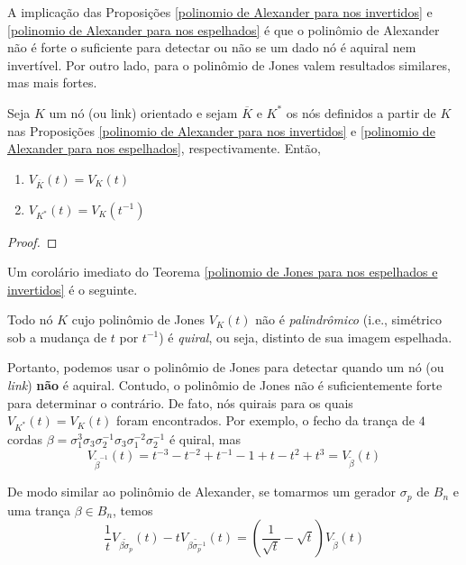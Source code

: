 	\par\vspace{0.3cm} A implicação das Proposições \eqref{polinomio de Alexander para nos invertidos} e \eqref{polinomio de Alexander para nos espelhados} é que o polinômio de Alexander não é forte o suficiente para detectar ou não se um dado nó é aquiral nem invertível. Por outro lado, para o polinômio de Jones valem resultados similares, mas mais fortes.
	\begin{theorem}
		\label{polinomio de Jones para nos espelhados e invertidos}
		Seja $K$ um nó (ou link) orientado e sejam $\overline{K}$ e $K^\ast$ os nós definidos a partir de $K$ nas Proposições \eqref{polinomio de Alexander para nos invertidos} e \eqref{polinomio de Alexander para nos espelhados}, respectivamente. Então,
		\begin{enumerate}
			\item $V_{\overline{K}}(t) = V_K(t)$ 
			\item $V_{K^\ast}(t) = V_K(t^{-1})$
		\end{enumerate}
	\end{theorem}
	\begin{proof}
		
	\end{proof}
	\par\vspace{0.3cm} Um corolário imediato do Teorema \eqref{polinomio de Jones para nos espelhados e invertidos} é o seguinte.
	\begin{corollary}
		\label{simetria polinomio de Jones}
		Todo nó $K$ cujo polinômio de Jones $V_K(t)$ não é \textit{palindrômico} (i.e., simétrico sob a mudança de $t$ por $t^{-1}$) é \textit{quiral}, ou seja, distinto de sua imagem espelhada.
	\end{corollary}
	\par\vspace{0.3cm} Portanto, podemos usar o polinômio de Jones para detectar quando um nó (ou \textit{link}) \textbf{não} é aquiral. Contudo, o polinômio de Jones não é suficientemente forte para determinar o contrário. De fato, nós quirais para os quais $V_{K^\ast}(t) = V_K(t)$ foram encontrados. Por exemplo, o fecho da trança de $4$ cordas $\beta = \sigma_1^3\sigma_3\sigma_2^{-1}\sigma_3\sigma_1^{-2}\sigma_2^{-1}$ é quiral, mas 
	\begin{equation*}
	V_{\widetilde{\beta}^{-1}}(t) = t^{-3} - t^{-2} + t^{-1} - 1 + t - t^2 + t^3 = V_{\widetilde{\beta}}(t)
	\end{equation*}
	\par\vspace{0.3cm} De modo similar ao polinômio de Alexander, se tomarmos um gerador $\sigma_p$ de $B_n$ e uma trança $\beta\in B_n$, temos
	\begin{equation*}
	\frac{1}{t}V_{\widetilde{\beta\sigma_p}}(t) - tV_{\widetilde{\beta\sigma_p^{-1}}}(t) = \left( \frac{1}{\sqrt{t}} - \sqrt{t}\right)V_{\widetilde{\beta}}(t)
	\end{equation*}
